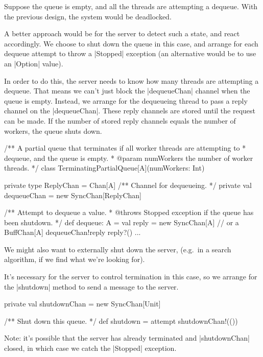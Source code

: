 
\begin{slide}

Suppose the queue is empty, and all the threads are attempting a dequeue.
With the previous design, the system would be deadlocked.

A better approach would be for the server to detect such a state, and react
accordingly.  We choose to shut down the queue in this case, and arrange for
each dequeue attempt to throw a |Stopped| exception (an alternative would be
to use an |Option| value).

In order to do this, the server needs to know how many threads are attempting
a dequeue.  That means we can't just block the |dequeueChan| channel when the
queue is empty.  Instead, we arrange for the dequeueing thread to pass a reply
channel on the |dequeueChan|.  These reply channels are stored until the
request can be made.  If the number of stored reply channels equals the number
of workers, the queue shuts down.
\end{slide}


\begin{slide}

\begin{scala}
/** A partial queue that terminates if all worker threads are attempting to
  * dequeue, and the queue is empty.
  * @param numWorkers the number of worker threads. */
class TerminatingPartialQueue[A](numWorkers: Int){
  private type ReplyChan = Chan[A]
  /** Channel for dequeueing. */
  private val dequeueChan = new SyncChan[ReplyChan]

  /** Attempt to dequeue a value.
    * @throws Stopped exception if the queue has been shutdown. */
  def dequeue: A = {
    val reply = new SyncChan[A] // or a BuffChan[A]
    dequeueChan!reply
    reply?()
  }
  ... 
}
\end{scala}
\end{slide}


\begin{slide}

We might also want to externally shut down the server, (e.g.~in a search
algorithm, if we find what we're looking for).

It's necessary for the server to control termination in this case, so we
arrange for the |shutdown| method to send a message to the server. 
%
\begin{scala}
  private val shutdownChan = new SyncChan[Unit]

  /** Shut down this queue. */
  def shutdown = attempt{ shutdownChan!(()) }{ }
\end{scala}
Note: it's possible that the server has already terminated and |shutdownChan|
closed, in which case we catch the |Stopped| exception.

\end{slide}
  

